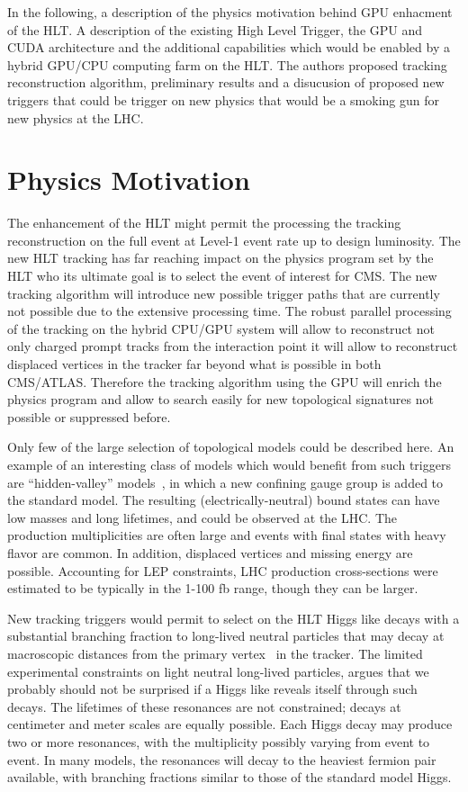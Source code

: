 \documentclass{JINST}
\begin{document}
In the following, a description of the physics motivation behind GPU enhacment of the HLT.
A description of the existing High Level Trigger, 
the GPU and CUDA architecture and the additional capabilities
which would be enabled by a hybrid GPU/CPU computing farm on the HLT. 
The authors proposed tracking reconstruction algorithm, preliminary results
and a disucusion of proposed new triggers that could be trigger on new
physics that would be a smoking gun for new physics at the LHC.


\section{Physics Motivation}

The enhancement of the HLT might permit the processing the tracking reconstruction on the full event 
at Level-1 event rate up to  design luminosity. The new HLT tracking  has far reaching impact on the physics program 
set by the HLT who its ultimate goal is to select the event of interest for CMS.
The new tracking algorithm  will introduce new possible trigger paths that are currently not possible  due to the extensive
 processing time. The robust parallel processing of the tracking on the 
hybrid CPU/GPU system will allow to reconstruct not only charged prompt tracks from the interaction point
it will allow to reconstruct  displaced vertices in the tracker far beyond what is possible in both CMS/ATLAS.
Therefore the tracking algorithm using the GPU will enrich the physics program and allow to search easily for new topological 
signatures not possible or suppressed before.

Only few of the large selection of topological models could be described here. An example of an
interesting class of models which would benefit from such triggers are  “hidden-valley” models~\cite{bib:hiddenvalley}, 
in which a new confining gauge group is added to the standard model. The resulting (electrically-neutral) bound states can have
 low masses and long lifetimes, and could be  observed at the LHC. The production multiplicities are often large and events with final states with heavy flavor are
common. In addition,  displaced vertices and missing energy are possible. Accounting for LEP constraints, LHC production 
cross-sections were estimated to be  typically in the 1-100 fb range, though they can be larger.

New tracking triggers would permit to select on the HLT Higgs like  decays with a substantial branching fraction to long-lived neutral particles that may decay 
at macroscopic distances from the primary vertex~\cite{bib:hiddenvalley} in the tracker. The limited experimental constraints on light neutral long-lived particles, 
argues that we probably should not be surprised if a Higgs like reveals itself  through such decays. The lifetimes of these resonances 
are not constrained; decays at centimeter and meter scales are equally possible. Each Higgs decay may produce two or more resonances, 
with the multiplicity possibly varying from event to event. In many models, the resonances will decay to the heaviest fermion 
pair available, with branching fractions similar to those of the standard model Higgs.  
\end{document}
